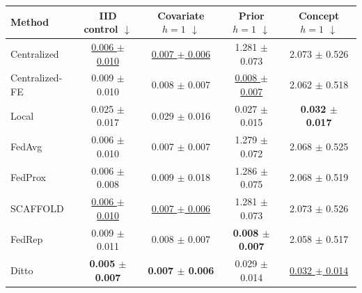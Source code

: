 \begin{tabular}{lcccc}
\toprule
Method & IID control $\downarrow$ & Covariate $h=1$ $\downarrow$ & Prior $h=1$ $\downarrow$ & Concept $h=1$ $\downarrow$ \\
\midrule
Centralized & \underline{0.006 $\pm$ 0.010} & \underline{0.007 $\pm$ 0.006} & 1.281 $\pm$ 0.073 & 2.073 $\pm$ 0.526 \\
Centralized-FE & 0.009 $\pm$ 0.010 & 0.008 $\pm$ 0.007 & \underline{0.008 $\pm$ 0.007} & 2.062 $\pm$ 0.518 \\
Local & 0.025 $\pm$ 0.017 & 0.029 $\pm$ 0.016 & 0.027 $\pm$ 0.015 & \textbf{0.032 $\pm$ 0.017} \\
FedAvg & 0.006 $\pm$ 0.010 & 0.007 $\pm$ 0.007 & 1.279 $\pm$ 0.072 & 2.068 $\pm$ 0.525 \\
FedProx & 0.006 $\pm$ 0.008 & 0.009 $\pm$ 0.018 & 1.286 $\pm$ 0.075 & 2.068 $\pm$ 0.519 \\
SCAFFOLD & \underline{0.006 $\pm$ 0.010} & \underline{0.007 $\pm$ 0.006} & 1.281 $\pm$ 0.073 & 2.073 $\pm$ 0.526 \\
FedRep & 0.009 $\pm$ 0.011 & 0.008 $\pm$ 0.007 & \textbf{0.008 $\pm$ 0.007} & 2.058 $\pm$ 0.517 \\
Ditto & \textbf{0.005 $\pm$ 0.007} & \textbf{0.007 $\pm$ 0.006} & 0.029 $\pm$ 0.014 & \underline{0.032 $\pm$ 0.014} \\
\bottomrule
\end{tabular}
